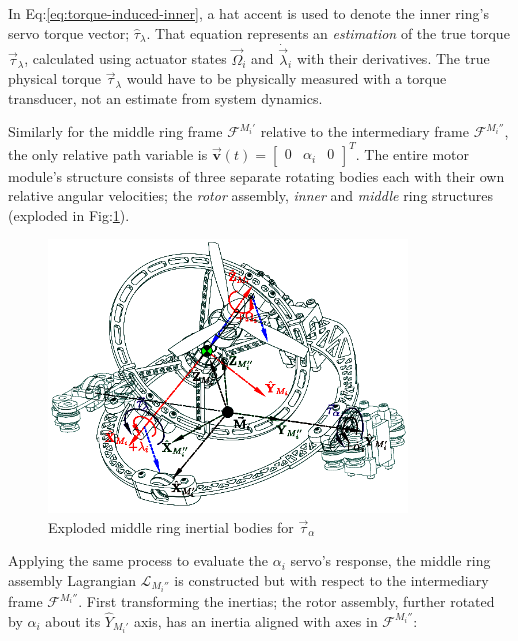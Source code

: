 \par
In Eq:\ref{eq:torque-induced-inner}, a hat accent is used to denote the inner ring's servo torque vector; $\hat{\tau}_\lambda$. That equation represents an \emph{estimation} of the true torque $\vec{\tau}_\lambda$, calculated using actuator states $\vec{\Omega}_i$ and $\dot{\vec{\lambda}}_i$ with their derivatives. The true physical torque $\vec{\tau}_\lambda$ would have to be physically measured with a torque transducer, not an estimate from system dynamics.
\par
Similarly for the middle ring frame $\mathcal{F}^{M_i'}$ relative to the intermediary frame $\mathcal{F}^{M_i''}$, the only relative path variable is $\vec{\mathbf{v}}(t)=\begin{bmatrix}0 & \alpha_i & 0\end{bmatrix}^T$. The entire motor module's structure consists of three separate rotating bodies each with their own relative angular velocities; the \emph{rotor} assembly, \emph{inner} and \emph{middle} ring structures (exploded in Fig:\ref{fig:response-middle}).
\begin{figure}[htbp]
\centering
\includegraphics[width=0.85\textwidth]{figs/response-middle}
\caption{Exploded middle ring inertial bodies for $\vec{\tau}_{\alpha}$}
\label{fig:response-middle}
\vspace{-16pt}
\end{figure}
\par
Applying the same process to evaluate the $ \alpha_i$ servo's response, the middle ring assembly Lagrangian $\mathcal{L}_{M_i''}$ is constructed but with respect to the intermediary frame $\mathcal{F}^{M_i''}$. First transforming the inertias; the rotor assembly, further rotated by $\alpha_i$ about its $\hat{Y}_{M_i'}$ axis, has an inertia aligned with axes in $\mathcal{F}^{M_i''}$:

